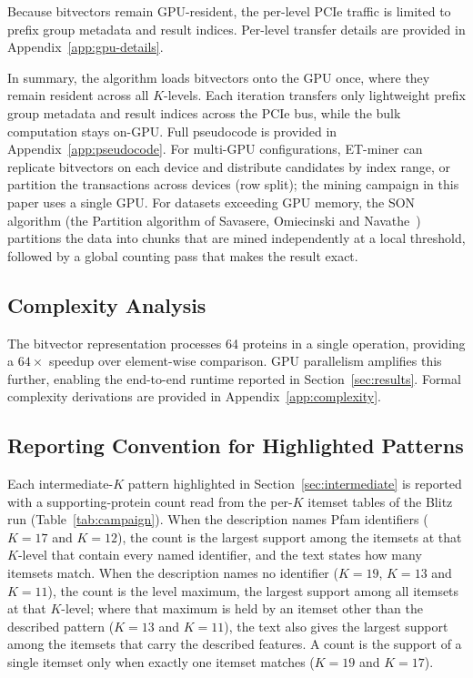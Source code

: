 \documentclass[10pt,a4paper,twocolumn]{article}
\begin{document}
Because bitvectors remain GPU-resident, the per-level PCIe traffic is limited to prefix group metadata and result indices. Per-level transfer details
are provided in Appendix~\ref{app:gpu-details}.

\noindent In summary, the algorithm loads bitvectors onto the GPU once, where they remain resident across all $K$-levels. Each iteration transfers only lightweight prefix group metadata and result indices across the PCIe bus, while the bulk computation stays on-GPU. Full pseudocode is provided in Appendix~\ref{app:pseudocode}. For multi-GPU configurations, ET-miner can replicate bitvectors on each device and distribute candidates by index range, or partition the transactions across devices (row split); the mining campaign in this paper uses a single GPU. For datasets exceeding GPU memory, the SON algorithm (the Partition algorithm of Savasere, Omiecinski and Navathe~\cite{savasere1995}) partitions the data into chunks that are mined independently at a local threshold, followed by a global counting pass that makes the result exact.

\subsection{Complexity Analysis}

The bitvector representation processes 64 proteins in a single operation,
providing a $64\times$ speedup over element-wise comparison. GPU parallelism
amplifies this further, enabling the end-to-end runtime reported in
Section~\ref{sec:results}. Formal complexity derivations are provided
in Appendix~\ref{app:complexity}.

\subsection{Reporting Convention for Highlighted Patterns}
\label{sec:reporting}

Each intermediate-$K$ pattern highlighted in Section~\ref{sec:intermediate} is reported with a supporting-protein count read from the per-$K$ itemset tables of the Blitz run (Table~\ref{tab:campaign}). When the description names Pfam identifiers ($K{=}17$ and $K{=}12$), the count is the largest support among the itemsets at that $K$-level that contain every named identifier, and the text states how many itemsets match. When the description names no identifier ($K{=}19$, $K{=}13$ and $K{=}11$), the count is the level maximum, the largest support among all itemsets at that $K$-level; where that maximum is held by an itemset other than the described pattern ($K{=}13$ and $K{=}11$), the text also gives the largest support among the itemsets that carry the described features. A count is the support of a single itemset only when exactly one itemset matches ($K{=}19$ and $K{=}17$).
\end{document}
